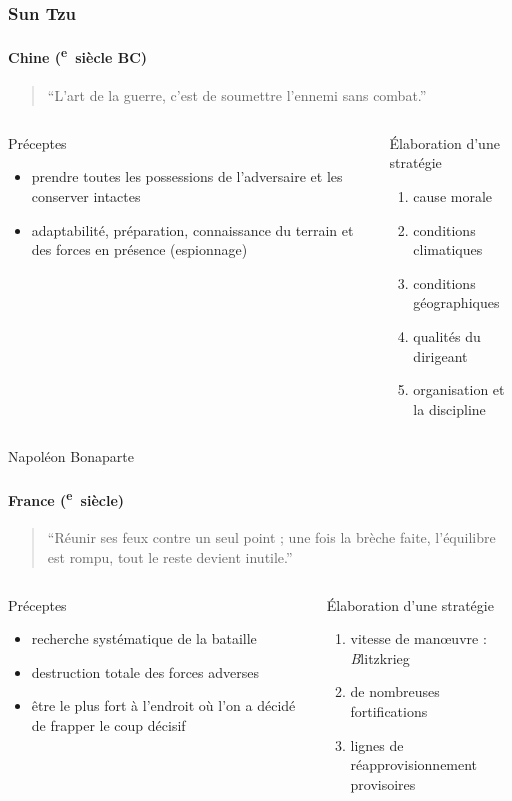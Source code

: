 \documentclass[utf8]{beamer}
\newcommand{\cRM}[1]{\MakeUppercase{\romannumeral #1}}  %
\newcommand{\siecle}[1]{\cRM{#1}\textsuperscript{e}~siècle}
\begin{document}
\begin{frame}
\frametitle{Sun Tzu}
\framesubtitle{Chine (\siecle{6} BC)}
\begin{quote}“L'art de la guerre, c'est de soumettre l'ennemi sans combat.”\end{quote}
\vfill
\begin{columns}[t]
\begin{column}{0.5\linewidth}
Préceptes
\begin{itemize}
\item prendre toutes les possessions de l'adversaire et les conserver intactes
\item adaptabilité, préparation, connaissance du terrain et des forces en présence (espionnage)
\end{itemize}
\end{column}
\begin{column}{0.5\linewidth}
Élaboration d'une stratégie
\begin{enumerate}
\item cause morale
\item conditions climatiques
\item conditions géographiques
\item qualités du dirigeant
\item organisation et la discipline
\end{enumerate}
\end{column}
\end{columns}

\end{frame}

\begin{frame}{Napoléon Bonaparte}
\framesubtitle{France (\siecle{18})}
\begin{quote}“Réunir ses feux contre un seul point ; une fois la brèche faite, l’équilibre est rompu, tout le reste devient inutile.”\end{quote}
\vfill
\begin{columns}[t]
\begin{column}{0.5\linewidth}
Préceptes
\begin{itemize}
\item recherche systématique de la bataille
\item destruction totale des forces adverses
\item être le plus fort à l’endroit où l’on a décidé de frapper le coup décisif
\end{itemize}
\end{column}
\begin{column}{0.5\linewidth}
Élaboration d'une stratégie
\begin{enumerate}
\item vitesse de manœuvre : {\emph Blitzkrieg}
\item de nombreuses fortifications
\item lignes de réapprovisionnement provisoires
\end{enumerate}
\end{column}
\end{columns}

\end{frame}
\end{document}
